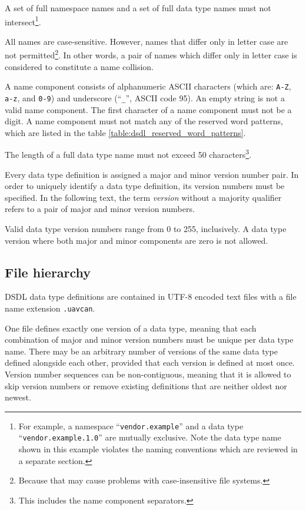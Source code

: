 A set of full namespace names and a set of full data type names must not intersect\footnote{%
    For example, a namespace ``\texttt{vendor.example}'' and a data type ``\texttt{vendor.example.1.0}''
    are mutually exclusive.
    Note the data type name shown in this example violates the naming conventions
    which are reviewed in a separate section.
}.

All names are case-sensitive.
However, names that differ only in letter case are not permitted\footnote{%
Because that may cause problems with case-insensitive file systems.}.
In other words, a pair of names which differ only in letter case is considered to constitute a name collision.

A name component consists of alphanumeric ASCII characters (which are: \verb|A-Z|, \verb|a-z|, and \verb|0-9|)
and underscore (``\verb|_|'', ASCII code 95).
An empty string is not a valid name component.
The first character of a name component must not be a digit.
A name component must not match any of the reserved word patterns,
which are listed in the table \ref{table:dsdl_reserved_word_patterns}.

The length of a full data type name must not exceed 50
characters\footnote{This includes the name component separators.}.

Every data type definition is assigned a major and minor version number pair.
In order to uniquely identify a data type definition, its version numbers must be specified.
In the following text, the term \emph{version} without a majority qualifier refers to
a pair of major and minor version numbers.

Valid data type version numbers range from 0 to 255, inclusively.
A data type version where both major and minor components are zero is not allowed.

\subsection{File hierarchy}

DSDL data type definitions are contained in UTF-8 encoded text files with a file name extension \verb|.uavcan|.

One file defines exactly one version of a data type,
meaning that each combination of major and minor version numbers must be unique per data type name.
There may be an arbitrary number of versions of the same data type defined alongside each other,
provided that each version is defined at most once.
Version number sequences can be non-contiguous,
meaning that it is allowed to skip version numbers or remove existing definitions that are neither oldest nor newest.

